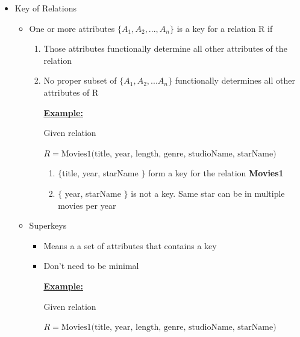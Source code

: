 \documentclass[12pt]{article}
\begin{document}
\begin{enumerate}[1.]
\begin{itemize}
\begin{itemize}
        \end{itemize}

        \item Key of Relations
        \begin{itemize}
            \item One or more attributes $\{A_1,A_2,...,A_n\}$ is a key for a relation R if
            \begin{enumerate}[1.]
                \item Those attributes functionally determine all other attributes of the relation
                \item No proper subset of $\{A_1,A_2,...A_n\}$ functionally determines all other attributes of R


                \bigskip

                \underline{\textbf{Example:}}

                \bigskip

                Given relation

                \bigskip

                $R = \text{Movies1(title, year, length, genre, studioName, starName)}$

                \begin{enumerate}
                    \item $\{$title, year, starName $\}$ form a key for the relation \textbf{Movies1}
                    \item $\{$ year, starName $\}$ is not a key. Same star can be in multiple
                    movies per year
                \end{enumerate}
            \end{enumerate}

            \item Superkeys
            \begin{itemize}
                \item Means a a set of attributes that contains a key
                \item Don't need to be minimal

                \bigskip

                \underline{\textbf{Example:}}

                Given relation

                \bigskip

                $R = \text{Movies1(title, year, length, genre, studioName, starName)}$


\end{itemize}
\end{itemize}
\end{itemize}
\end{enumerate}
\end{document}
